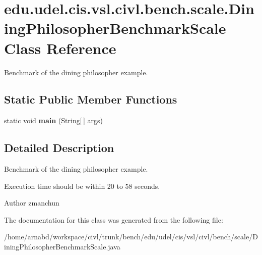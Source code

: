 \hypertarget{classedu_1_1udel_1_1cis_1_1vsl_1_1civl_1_1bench_1_1scale_1_1DiningPhilosopherBenchmarkScale}{}\section{edu.\+udel.\+cis.\+vsl.\+civl.\+bench.\+scale.\+Dining\+Philosopher\+Benchmark\+Scale Class Reference}
\label{classedu_1_1udel_1_1cis_1_1vsl_1_1civl_1_1bench_1_1scale_1_1DiningPhilosopherBenchmarkScale}


Benchmark of the dining philosopher example.  


\subsection*{Static Public Member Functions}
\begin{DoxyCompactItemize}
\item 
\hypertarget{classedu_1_1udel_1_1cis_1_1vsl_1_1civl_1_1bench_1_1scale_1_1DiningPhilosopherBenchmarkScale_a32ded69517a5713009852e1877facf83}{}static void {\bfseries main} (String\mbox{[}$\,$\mbox{]} args)\label{classedu_1_1udel_1_1cis_1_1vsl_1_1civl_1_1bench_1_1scale_1_1DiningPhilosopherBenchmarkScale_a32ded69517a5713009852e1877facf83}

\end{DoxyCompactItemize}


\subsection{Detailed Description}
Benchmark of the dining philosopher example. 

Execution time should be within 20 to 58 seconds.

\begin{DoxyAuthor}{Author}
zmanchun 
\end{DoxyAuthor}


The documentation for this class was generated from the following file\+:\begin{DoxyCompactItemize}
\item 
/home/arnabd/workspace/civl/trunk/bench/edu/udel/cis/vsl/civl/bench/scale/Dining\+Philosopher\+Benchmark\+Scale.\+java\end{DoxyCompactItemize}
